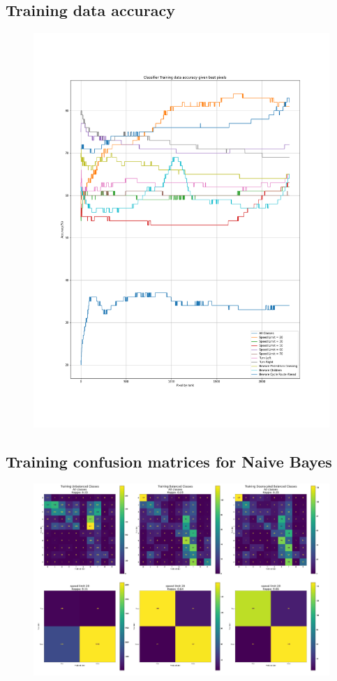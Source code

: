 \documentclass[11pt]{article}
\begin{document}
\begin{appendices}
\subsection{Training data accuracy}\label{train_2304}
\begin{figure}[h!]
  \centering
  \includegraphics[scale=0.4]{Images/train_2304_pixels.png}
\end{figure}

\newpage
\subsection{Training confusion matrices for Naive Bayes}\label{NaiveBayesConfMatTraining}
\begin{figure}[h!]
  \centering
  \includegraphics[scale=0.5]{Images/NaiveBayesConfMatTraining.PNG}
\end{figure}

\end{appendices}
\end{document}
